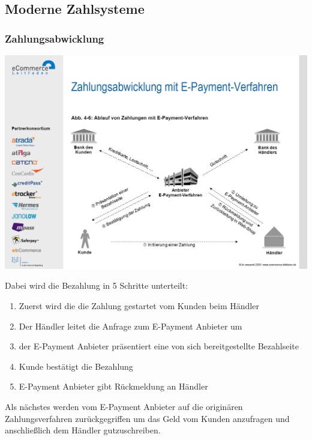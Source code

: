 
\subsection{Moderne Zahlsysteme}
\subsubsection{Zahlungsabwicklung}

\begin{minipage}{\linewidth}
	\centering
	\includegraphics[width=1\linewidth]{images/zahlungsabwicklung}
\end{minipage}

Dabei wird die Bezahlung in 5 Schritte unterteilt:

\begin{enumerate}
	\item Zuerst wird die die Zahlung gestartet vom Kunden beim Händler
	\item Der Händler leitet die Anfrage zum E-Payment Anbieter um
	\item der E-Payment Anbieter präsentiert eine von sich bereitgestellte Bezahlseite
	\item Kunde bestätigt die Bezahlung
	\item E-Payment Anbieter gibt Rückmeldung an Händler
\end{enumerate}

Als nächstes werden vom E-Payment Anbieter auf die originären Zahlungsverfahren zurückgegriffen um das Geld vom Kunden anzufragen und anschließlich dem Händler gutzuschreiben. 

